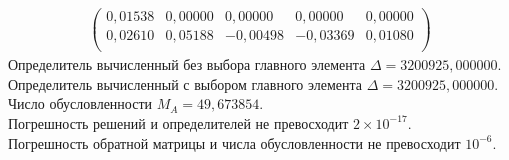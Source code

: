 \documentclass[a4paper,12pt,titlepage,finall]{article}
\begin{document}
\begin{enumerate}
\begin{align*}
\begin{pmatrix}
   0,01538&     0,00000&     0,00000&     0,00000&     0,00000 \\
   0,02610&     0,05188&    -0,00498&    -0,03369&     0,01080 \\
\end{pmatrix}
\end{align*}
Определитель вычисленный без выбора главного элемента  $\Delta = 3200925,000000$.\\
Определитель вычисленный с выбором главного элемента $\Delta = 3200925,000000$.\\
Число обусловленности $M_A = 49,673854$.\\
Погрешность решений и определителей не превосходит $2 \times 10^{-17}$.\\
Погрешность обратной матрицы и числа обусловленности не превосходит $10^{-6}$.


\end{enumerate}
\end{document}

